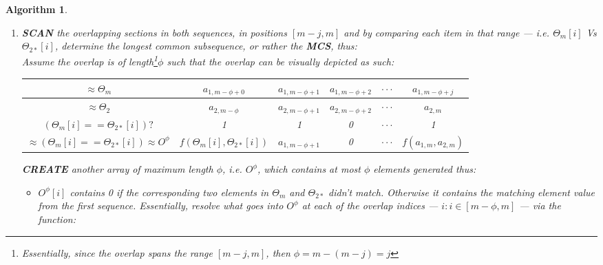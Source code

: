 \documentclass[a4paper, 18pt]{book} %
\newtheorem{alg}{Algorithm}
\newcommand{\invpi}{\rotatebox[origin=c]{180}{$\pi$}}
\begin{document}
\begin{alg}
\begin{enumerate}
{\begin{enumerate}
{and so that $\Theta_2$ shall be occupying the updated range: 

\vspace{1em}
$A_2: [m + 1 - j,\quad m+\invpi(\Theta_{2*}) - j]$
\vspace{1em}
}
\item {
\textbf{SCAN}  the overlapping sections in both sequences, in positions  $[m-j, m]$ and by comparing each item in that range --- i.e. $\Theta_m[i]$ Vs $\Theta_{2*}[i]$, determine the longest common subsequence, or rather the \textbf{MCS}, thus:\\

Assume the overlap is of length\footnote{Essentially, since the overlap spans the range $[m-j, m]$, then $\phi = m - (m-j) = j$}$\phi$ such that the overlap can be visually depicted as such:

{

\vspace{2em}
\begin{adjustwidth}{-4em}{}
\begin{tabular}[H]{|c||c|c|c|c|c|}
\hline
$\approx \Theta_m$ & $a_{1,m-\phi+0}$ &$a_{1,m-\phi+1}$ & $a_{1,m-\phi+2}$ & $\cdot\cdot\cdot$ & $a_{1,m-\phi+j}$\\
\hline
$\approx \Theta_2$ & $a_{2,m-\phi}$ &$a_{2,m-\phi+1}$ & $a_{2,m-\phi+2}$ & $\cdot\cdot\cdot$ & $a_{2,m}$\\
\hline
$(\Theta_m[i] == \Theta_{2*}[i])?$ & 1 & 1& 0 &  $\cdot\cdot\cdot$ & 1\\
\hline
$\approx (\Theta_m[i] == \Theta_{2*}[i]) \approx O^\phi$ & $f(\Theta_m[i],\Theta_{2*}[i])$ & $a_{1,m-\phi+1}$ & 0 &  $\cdot\cdot\cdot$ & $f(a_{1,m},a_{2,m})$ \\
\hline
 \end{tabular}
 \end{adjustwidth}
  \vspace{2em}

 }

 
 \textbf{CREATE}  another array of maximum length $\phi$, i.e. $O^\phi$, which contains at most $\phi$ elements generated thus:
 \begin{itemize}
 \item{ $O^\phi[i]$ contains 0 if the corresponding two elements in $\Theta_m$ and $\Theta_{2*}$ didn't match. Otherwise it contains the matching element value from the first sequence. Essentially, resolve what goes into $O^\phi$ at each of the overlap indices --- $i: i \in [m-\phi, m]$ ---  via the function:
 
}
\end{itemize}}
\end{enumerate}}
\end{enumerate}
\end{alg}
\end{document}
